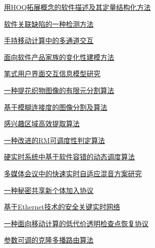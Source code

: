 \documentclass[a4paper]{article}
\begin{document}
\href{http://www.jos.org.cn/ch/reader/download_pdf.aspx?file_no=20050102&year_id=2005&quarter_id=1&falg=1}{用HOQ拓展概念的软件描述及其定量结构化方法}

\href{http://www.jos.org.cn/ch/reader/download_pdf.aspx?file_no=20050103&year_id=2005&quarter_id=1&falg=1}{软件关联缺陷的一种检测方法}

\href{http://www.jos.org.cn/ch/reader/download_pdf.aspx?file_no=20050104&year_id=2005&quarter_id=1&falg=1}{手持移动计算中的多通道交互}

\href{http://www.jos.org.cn/ch/reader/download_pdf.aspx?file_no=20050105&year_id=2005&quarter_id=1&falg=1}{面向软件产品家族的变化性建模方法}

\href{http://www.jos.org.cn/ch/reader/download_pdf.aspx?file_no=20050106&year_id=2005&quarter_id=1&falg=1}{笔式用户界面交互信息模型研究}

\href{http://www.jos.org.cn/ch/reader/download_pdf.aspx?file_no=20050107&year_id=2005&quarter_id=1&falg=1}{一种提花织物图像的有限元分割算法}

\href{http://www.jos.org.cn/ch/reader/download_pdf.aspx?file_no=20050108&year_id=2005&quarter_id=1&falg=1}{基于模糊连接度的图像分割及算法}

\href{http://www.jos.org.cn/ch/reader/download_pdf.aspx?file_no=20050109&year_id=2005&quarter_id=1&falg=1}{感兴趣区域高效提取算法}

\href{http://www.jos.org.cn/ch/reader/download_pdf.aspx?file_no=20050110&year_id=2005&quarter_id=1&falg=1}{一种改进的RM可调度性判定算法}

\href{http://www.jos.org.cn/ch/reader/download_pdf.aspx?file_no=20050111&year_id=2005&quarter_id=1&falg=1}{硬实时系统中基于软件容错的动态调度算法}

\href{http://www.jos.org.cn/ch/reader/download_pdf.aspx?file_no=20050112&year_id=2005&quarter_id=1&falg=1}{多媒体会议中的快速实时自适应混音方案研究}

\href{http://www.jos.org.cn/ch/reader/download_pdf.aspx?file_no=20050113&year_id=2005&quarter_id=1&falg=1}{一种秘密共享新个体加入协议}

\href{http://www.jos.org.cn/ch/reader/download_pdf.aspx?file_no=20050114&year_id=2005&quarter_id=1&falg=1}{基于Ethernet技术的安全关键实时网络}

\href{http://www.jos.org.cn/ch/reader/download_pdf.aspx?file_no=20050115&year_id=2005&quarter_id=1&falg=1}{一种面向移动计算的低代价透明检查点恢复协议}

\href{http://www.jos.org.cn/ch/reader/download_pdf.aspx?file_no=20050116&year_id=2005&quarter_id=1&falg=1}{参数可调的克隆多播路由算法}
\end{document}
